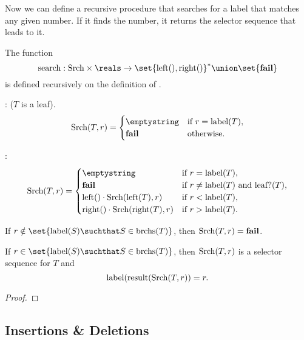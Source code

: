 Now we can define a recursive procedure that searches for a label that
matches any given number.  If it finds the number, it returns the
selector sequence that leads to it.
\begin{definition}
The function
\[
\text{search}: \srchtr \times \reals \to \set{\leftsub{},\rightsub{}}^* \union \set{\textbf{fail}}
\]
is defined recursively on the definition of \freetr.


: ($T$ is a leaf).
\[
\srchtr(T,r) = \begin{cases} 
\emptystring & \text{if}\ r = \text{label}(T),\\
\textbf{fail} & \text{otherwise}.
\end{cases}
\]

:
\[
\srchtr(T,r) = \begin{cases} 
\emptystring & \text{if $r = \text{label}(T)$},\\
\textbf{fail} & \text{if $r \neq \text{label}(T)$ and $\leafp{T}$},\\
\leftsub{}\cdot \srchtr(\leftsub{T},r) & \text{if $r < \text{label}(T)$},\\
\rightsub{}\cdot \srchtr(\rightsub{T},r) & \text{if $r > \text{label}(T)$}.
\end{cases}
\]
\end{definition}

\begin{theorem}
If $r \notin \set{\text{label}(S) \suchthat S \in \subbrn{T}}$, then
$\text{Srch}(T,r) = \textbf{fail}$.  

If $r \in \set{\text{label}(S) \suchthat S \in \subbrn{T}}$, then
$\text{Srch}(T,r)$ is a selector sequence for $T$ and
\[
\text{label}(\text{result}(\text{Srch}(T,r)) = r.
\]
\end{theorem}

\begin{proof}


\end{proof}

\subsection{Insertions \& Deletions}


  \endinput
